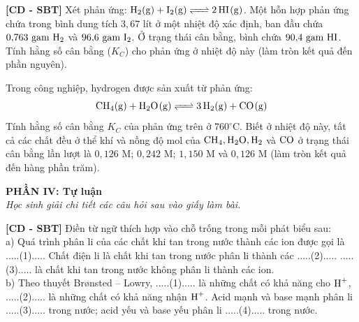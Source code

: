 \documentclass[12pt,a4paper]{article}
\begin{document}
\begin{ex}
\textbf{[CD - SBT]} Xét phản ứng: $\ce{H2(g) + I2(g) <=> 2HI(g)}$. Một hỗn hợp phản ứng chứa trong bình dung tích $3{,}67\text{ lít}$ ở một nhiệt độ xác định, ban đầu chứa $0{,}763\text{ gam } \ce{H2}$ và $96{,}6\text{ gam } \ce{I2}$. Ở trạng thái cân bằng, bình chứa $90{,}4\text{ gam } \ce{HI}$. Tính hằng số cân bằng ($K_C$) cho phản ứng ở nhiệt độ này (làm tròn kết quả đến phần nguyên).

\end{ex}

\begin{ex}
Trong công nghiệp, hydrogen được sản xuất từ phản ứng:
\[\ce{CH4(g) + H2O(g) <=> 3H2(g) + CO(g)}\]
Tính hằng số cân bằng $K_C$ của phản ứng trên ở $760^\circ\text{C}$. Biết ở nhiệt độ này, tất cả các chất đều ở thể khí và nồng độ mol của $\ce{CH4, H2O, H2}$ và $\ce{CO}$ ở trạng thái cân bằng lần lượt là $0{,}126\text{ M}$; $0{,}242\text{ M}$; $1{,}150\text{ M}$ và $0{,}126\text{ M}$ (làm tròn kết quả đến hàng phần trăm).

\end{ex}

\bigskip
\noindent
\textbf{PHẦN IV: Tự luận}\\
\textit{Học sinh giải chi tiết các câu hỏi sau vào giấy làm bài.}

\begin{ex}
\textbf{[CD - SBT]} Điền từ ngữ thích hợp vào chỗ trống trong mỗi phát biểu sau:\\
a) Quá trình phân li của các chất khi tan trong nước thành các ion được gọi là .....(1)..... Chất điện li là chất khi tan trong nước phân li thành các .....(2)..... .....(3)..... là chất khi tan trong nước không phân li thành các ion.\\
b) Theo thuyết Brønsted -- Lowry, .....(1)..... là những chất có khả năng cho $\ce{H+}$, .....(2)..... là những chất có khả năng nhận $\ce{H+}$. Acid mạnh và base mạnh phân li .....(3)..... trong nước; acid yếu và base yếu phân li .....(4)..... trong nước.

\end{ex}
\end{document}
